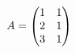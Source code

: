 \documentclass[preview]{standalone}
\begin{document}
\begin{align*}
\special{dvisvgm:raw <g id='unique000'>}A=\begin{pmatrix}1&1\\2&1\\3&1\end{pmatrix}\special{dvisvgm:raw </g>}
\end{align*}
\end{document}
